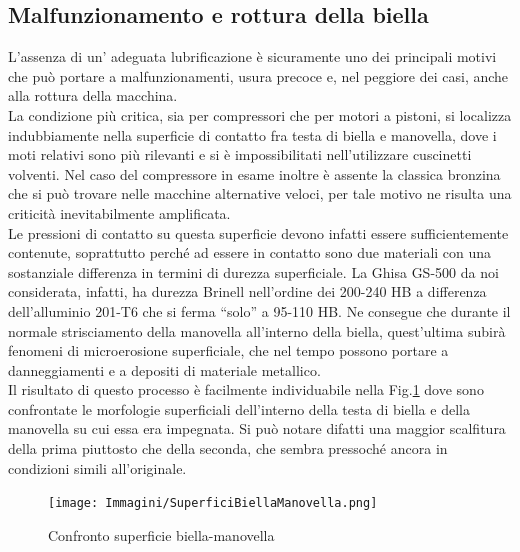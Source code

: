 \subsection{Malfunzionamento e rottura della biella}
L’assenza di un' adeguata lubrificazione è sicuramente uno dei principali motivi che può portare a malfunzionamenti, usura precoce e, nel peggiore dei casi, anche alla rottura della macchina. \\
La condizione più critica, sia per compressori che per motori a pistoni, si localizza indubbiamente nella superficie di contatto fra testa di biella e manovella, dove i moti relativi sono più rilevanti e si è impossibilitati nell’utilizzare cuscinetti volventi. Nel caso del compressore in esame inoltre è assente la classica bronzina che si può trovare nelle macchine alternative veloci, per tale motivo ne risulta una criticità inevitabilmente amplificata. \\
Le pressioni di contatto su questa superficie devono infatti essere sufficientemente contenute, soprattutto perché ad essere in contatto sono due materiali con una sostanziale differenza in termini di durezza superficiale. La Ghisa GS-500 da noi considerata, infatti, ha durezza Brinell nell’ordine dei 200-240 HB a differenza dell’alluminio 201-T6 che si ferma “solo” a 95-110 HB. Ne consegue che durante il normale strisciamento della manovella all’interno della biella, quest’ultima subirà fenomeni di microerosione superficiale, che nel tempo possono portare a danneggiamenti e a depositi di materiale metallico.\\
Il risultato di questo processo è facilmente individuabile nella Fig.\ref{fig:SuperficiBiellaManovella} dove sono confrontate le morfologie superficiali dell’interno della testa di biella e della manovella su cui essa era impegnata. Si può notare difatti una maggior scalfitura della prima piuttosto che della seconda, che sembra pressoché ancora in condizioni simili all’originale. \\
\begin{figure}[h]
    \centering
    \texttt{[image: Immagini/SuperficiBiellaManovella.png]}
    \caption{Confronto superficie biella-manovella}
    \label{fig:SuperficiBiellaManovella}
\end{figure}

